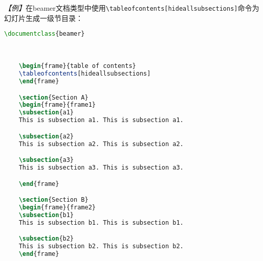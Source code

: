 \emph{【例】}在beamer文档类型中使用\texttt{\textbackslash{}tableofcontents[hideallsubsections]}命令为幻灯片生成一级节目录：
\begin{lstlisting}[language=TeX]
    \documentclass{beamer}

    

    \begin{frame}{table of contents}
    \tableofcontents[hideallsubsections]
    \end{frame}

    \section{Section A}
    \begin{frame}{frame1}
    \subsection{a1}
    This is subsection a1. This is subsection a1.

    \subsection{a2}
    This is subsection a2. This is subsection a2.

    \subsection{a3}
    This is subsection a3. This is subsection a3.

    \end{frame}

    \section{Section B}
    \begin{frame}{frame2}
    \subsection{b1}
    This is subsection b1. This is subsection b1.

    \subsection{b2}
    This is subsection b2. This is subsection b2.
    \end{frame}

    
\end{lstlisting}

